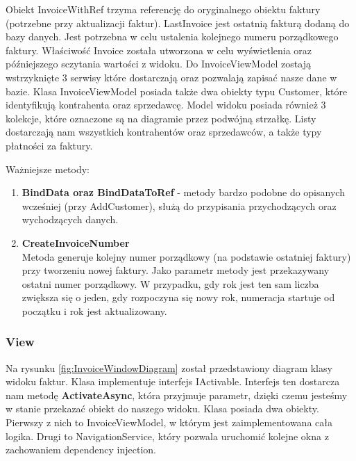 Obiekt InvoiceWithRef trzyma referencję do oryginalnego obiektu faktury (potrzebne przy aktualizacji faktur). LastInvoice jest ostatnią fakturą dodaną do bazy danych. Jest potrzebna w celu ustalenia kolejnego numeru porządkowego faktury. Właściwość Invoice została utworzona w celu wyświetlenia oraz późniejszego sczytania wartości z widoku. Do InvoiceViewModel zostają wstrzyknięte 3 serwisy które dostarczają oraz pozwalają zapisać nasze dane w bazie. Klasa InvoiceViewModel posiada także dwa obiekty typu Customer, które identyfikują kontrahenta oraz sprzedawcę. Model widoku posiada również 3 kolekcje, które oznaczone są na diagramie przez podwójną strzałkę. Listy dostarczają nam wszystkich kontrahentów oraz sprzedawców, a także typy płatności za faktury.

Ważniejsze metody:
\begin{enumerate}
    \item \textbf{BindData oraz BindDataToRef} - metody bardzo podobne do opisanych wcześniej (przy AddCustomer), służą do przypisania przychodzących oraz wychodzących danych.
    \item \textbf{CreateInvoiceNumber} \\
    Metoda generuje kolejny numer porządkowy (na podstawie ostatniej faktury) przy tworzeniu nowej faktury. Jako parametr metody jest przekazywany ostatni numer porządkowy. W przypadku, gdy rok jest ten sam liczba zwiększa się o jeden, gdy rozpoczyna się nowy rok, numeracja startuje od początku i rok jest aktualizowany.
\end{enumerate}

\subsubsection{View}
Na rysunku \ref{fig:InvoiceWindowDiagram} został przedstawiony diagram klasy widoku faktur. Klasa implementuje interfejs IActivable. Interfejs ten dostarcza nam metodę \textbf{ActivateAsync}, która przyjmuje parametr, dzięki czemu jesteśmy w stanie przekazać obiekt do naszego widoku. Klasa posiada dwa obiekty. Pierwszy z nich to InvoiceViewModel, w którym jest zaimplementowana cała logika. Drugi to NavigationService, który pozwala uruchomić kolejne okna z zachowaniem dependency injection. 

